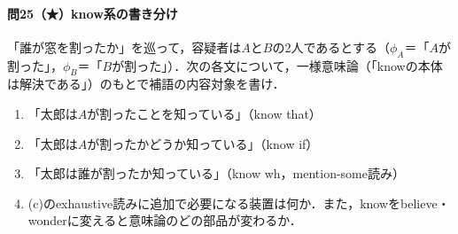 \documentclass[../../main-detail.tex]{subfiles}
\begin{document}
\paragraph{問25（★）know系の書き分け}
「誰が窓を割ったか」を巡って，容疑者は$A$と$B$の2人であるとする（$\phi_A$＝「$A$が割った」，$\phi_B$＝「$B$が割った」）．次の各文について，一様意味論（「knowの本体は解決である」）のもとで補語の内容対象を書け．
\begin{enumerate}[label=(\alph*)]
    \item 「太郎は$A$が割ったことを知っている」（know that）
    \item 「太郎は$A$が割ったかどうか知っている」（know if）
    \item 「太郎は誰が割ったか知っている」（know wh，mention-some読み）
    \item (c)のexhaustive読みに追加で必要になる装置は何か．また，knowをbelieve・wonderに変えると意味論のどの部品が変わるか．
\end{enumerate}
\end{document}
